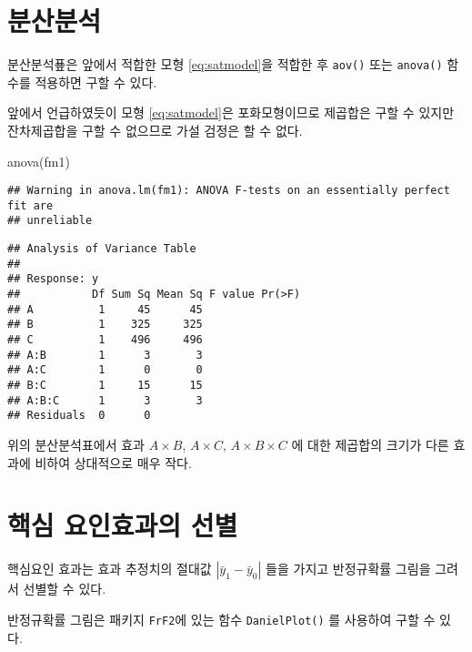 \documentclass[
]{book}
\newenvironment{Shaded}{\begin{snugshade}}{\end{snugshade}}
\newcommand{\FunctionTok}[1]{\textcolor[rgb]{0.00,0.00,0.00}{#1}}
\newcommand{\NormalTok}[1]{#1}
\begin{document}
\hypertarget{uxbd84uxc0b0uxbd84uxc11d}{%
\section{분산분석}\label{uxbd84uxc0b0uxbd84uxc11d}}

분산분석푶은 앞에서 적합한 모형 \eqref{eq:satmodel}을 적합한 후 \texttt{aov()} 또는 \texttt{anova()} 함수를 적용하면 구할 수 있다.

앞에서 언급하였듯이 모형 \eqref{eq:satmodel}은 포화모형이므로 제곱합은 구할 수 있지만
잔차제곱합을 구할 수 없으므로 가설 검정은 할 수 없다.

\begin{Shaded}
\begin{Highlighting}[]
\FunctionTok{anova}\NormalTok{(fm1)}
\end{Highlighting}
\end{Shaded}

\begin{verbatim}
## Warning in anova.lm(fm1): ANOVA F-tests on an essentially perfect fit are
## unreliable
\end{verbatim}

\begin{verbatim}
## Analysis of Variance Table
## 
## Response: y
##           Df Sum Sq Mean Sq F value Pr(>F)
## A          1     45      45               
## B          1    325     325               
## C          1    496     496               
## A:B        1      3       3               
## A:C        1      0       0               
## B:C        1     15      15               
## A:B:C      1      3       3               
## Residuals  0      0
\end{verbatim}

위의 분산분석표에서 효과 \(A \times B\), \(A \times C\), \(A \times B \times C\) 에 대한 제곱합의 크기가
다른 효과에 비하여 상대적으로 매우 작다.

\hypertarget{uxd575uxc2ec-uxc694uxc778uxd6a8uxacfcuxc758-uxc120uxbcc4}{%
\section{핵심 요인효과의 선별}\label{uxd575uxc2ec-uxc694uxc778uxd6a8uxacfcuxc758-uxc120uxbcc4}}

핵심요인 효과는 효과 추정치의 절대값 \(| \bar y_1 -\bar y_0|\) 들을 가지고 반정규확률 그림을 그려서 선별할 수 있다.

반정규확률 그림은 패키지 \texttt{FrF2}에 있는 함수 \texttt{DanielPlot()} 를 사용하여 구할 수 있다.
\end{document}
